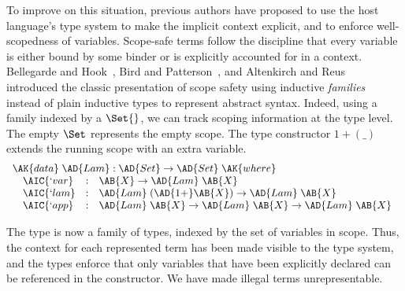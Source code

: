 To improve on this situation, previous authors have proposed to use
the host language's type system to make the implicit context explicit,
and to enforce well-scopedness of variables. Scope-safe terms follow
the discipline that every variable is either bound by some binder or
is explicitly accounted for in a context. Bellegarde and
Hook~\citeyear{BELLEGARDE1994287}, Bird and
Patterson~\citeyear{bird_paterson_1999}, and Altenkirch and
Reus~\citeyear{altenkirch1999monadic} introduced the classic
presentation of scope safety using inductive
\emph{families}~\cite{dybjer1994inductive} instead of plain inductive
types to represent abstract syntax. Indeed, using a family indexed by
a $\Set{}$, we can track scoping information at the type level. The
empty $\Set$ represents the empty scope. The type constructor
$1 + (\_)$ extends the running scope with an extra variable.
\begin{displaymath}
  \begin{array}{l}
    \AK{data}\;\AD{Lam} : \AD{Set} \to \AD{Set}\;\AK{where} \\
    \quad\begin{array}{@{}lll}
           \AIC{`var} &:& \AB{X} \to \AD{Lam}\;\AB{X} \\
           \AIC{`lam} &:& \AD{Lam}\;(\AD{1+} \AB{X}) \to \AD{Lam}\;\AB{X} \\
           \AIC{`app} &:& \AD{Lam}\;\AB{X} \to \AD{Lam}\;\AB{X} \to \AD{Lam}\;\AB{X}
    \end{array}
  \end{array}
\end{displaymath}



The  type is now a family of types, indexed by the set
of variables in scope. Thus, the context for each represented term has
been made visible to the type system, and the types enforce that only
variables that have been explicitly declared can be referenced in the
 constructor. We have made illegal terms
unrepresentable.


